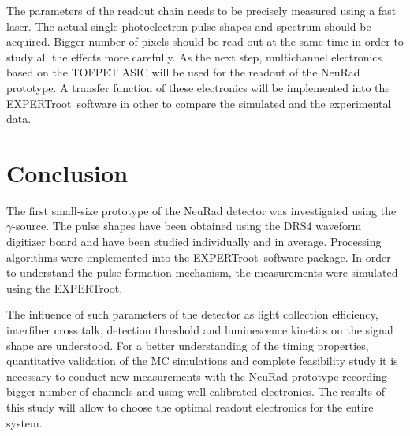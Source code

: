 \documentclass{webofc}
\newcommand{\er}{\textmd{EXPERTroot}}
\begin{document}
The parameters of the readout chain needs to be precisely measured using a fast laser. The actual single photoelectron pulse shapes and spectrum should be acquired. Bigger number of pixels should be read out at the same time in order to study all the effects more carefully. As the next step, multichannel electronics based on the TOFPET ASIC \cite{petsys} will be used for the readout of the NeuRad prototype. A transfer function of these electronics will be implemented into the \er\, software in other to compare the simulated and the experimental data.


\section{Conclusion}
		
	The first small-size prototype of the NeuRad detector was investigated using the $\gamma$-source. The pulse shapes have been obtained using the DRS4 waveform digitizer board and have been studied individually and in average. Processing algorithms were implemented into the \er\, software package.
	In order to understand the pulse formation mechanism, the measurements were simulated using the \er.
	
	The influence of such parameters of the detector as light collection efficiency, interfiber cross talk, detection threshold and luminescence kinetics on the signal shape are understood. For a better understanding of the timing properties, quantitative validation of the MC simulations and complete feasibility study it is necessary to conduct new measurements with the NeuRad prototype recording bigger number of channels and using well calibrated electronics.
	The results of this study will allow to choose the optimal readout electronics for the entire system.
	
	
	
	
	
\end{document}
